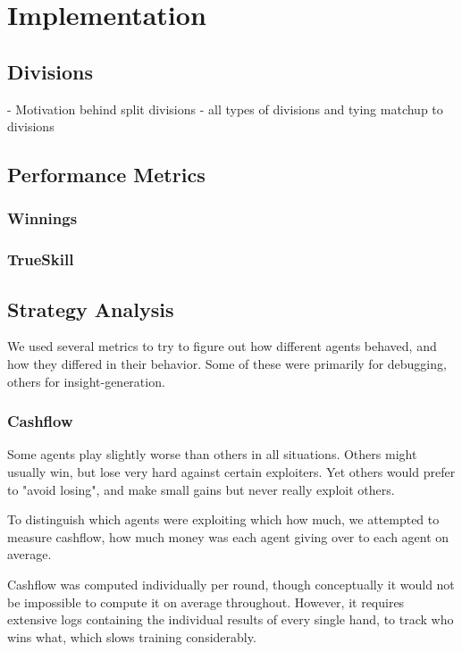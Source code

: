 \chapter{Implementation}

\section{Divisions}
- Motivation behind split divisions
- all types of divisions and tying matchup to divisions


\section{Performance Metrics}

\subsection{Winnings}

\subsection{TrueSkill}


\section{Strategy Analysis}

We used several metrics to try to figure out how different agents behaved, and how they differed in their behavior. Some of these were primarily for debugging, others for insight-generation.

\subsection{Cashflow}

Some agents play slightly worse than others in all situations. Others might usually win, but lose very hard against certain exploiters. Yet others would prefer to "avoid losing", and make small gains but never really exploit others.

To distinguish which agents were exploiting which how much, we attempted to measure cashflow, how much money was each agent giving over to each agent on average.


Cashflow was computed individually per round, though conceptually it would not be impossible to compute it on average throughout. However, it requires extensive logs containing the individual results of every single hand, to track who wins what, which slows training considerably.

